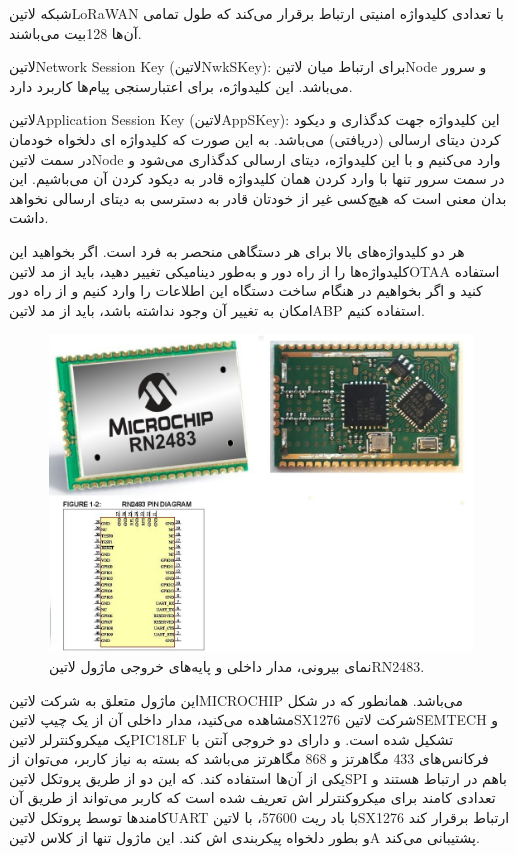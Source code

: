 
شبکه ‌لاتین{LoRaWAN} با تعدادی کلیدواژه امنیتی ارتباط برقرار می‌کند که طول تمامی آن‌ها 128بیت می‌باشند.

‌لاتین{Network Session Key} (‌لاتین{NwkSKey}): برای ارتباط میان ‌لاتین{Node} و سرور می‌باشد. این کلیدواژه، برای اعتبارسنجی پیام‌ها کاربرد دارد.

‌لاتین{Application Session Key} (‌لاتین{AppSKey}): این کلیدواژه جهت کدگذاری و دیکود کردن دیتای ارسالی (دریافتی) می‌باشد. به این صورت که کلیدواژه ای دلخواه خودمان در سمت ‌لاتین{Node} وارد می‌کنیم و با این کلیدواژه، دیتای ارسالی کدگذاری می‌شود و در سمت سرور تنها با وارد کردن همان کلیدواژه قادر به دیکود کردن آن می‌باشیم. این بدان معنی است که هیچ‌کسی غیر از خودتان قادر به دسترسی به دیتای ارسالی نخواهد داشت.

هر دو کلیدواژه‌های بالا برای هر دستگاهی منحصر به فرد است. اگر بخواهید این کلیدواژه‌ها را از راه دور و به‌طور دینامیکی تغییر دهید، باید از مد ‌لاتین{OTAA} استفاده کنید و اگر بخواهیم در هنگام ساخت دستگاه این اطلاعات را وارد کنیم و از راه دور امکان به تغییر آن وجود نداشته باشد، باید از مد ‌لاتین{ABP} استفاده کنیم.

\begin{figure}[!h]
	\centering
	\includegraphics[width=\linewidth]{Assets/RN2483.png}
	\caption{نمای بیرونی، مدار داخلی و پایه‌های خروجی ماژول ‌لاتین{RN2483}.}
	\label{fig:RN2483}
\end{figure}
این ماژول متعلق به شرکت ‌لاتین{MICROCHIP} می‌باشد. همانطور که در شکل  مشاهده می‌کنید، مدار داخلی آن از یک چیپ ‌لاتین{SX1276} شرکت ‌لاتین{SEMTECH} و یک میکروکنترلر ‌لاتین{PIC18LF} تشکیل شده است. و دارای دو خروجی آنتن با فرکانس‌های 433 مگاهرتز و 868 مگاهرتز می‌باشد که بسته به نیاز کاربر، می‌توان از یکی از آن‌ها استفاده کند. که این دو از طریق پروتکل ‌لاتین{SPI} باهم در ارتباط هستند و تعدادی کامند برای میکروکنترلر اش تعریف شده است که کاربر می‌تواند از طریق آن کامندها توسط پروتکل ‌لاتین{UART} با باد ریت 57600، با ‌لاتین{SX1276} ارتباط برقرار کند و بطور دلخواه پیکربندی اش کند. این ماژول تنها از کلاس ‌لاتین{A} پشتیبانی می‌کند.